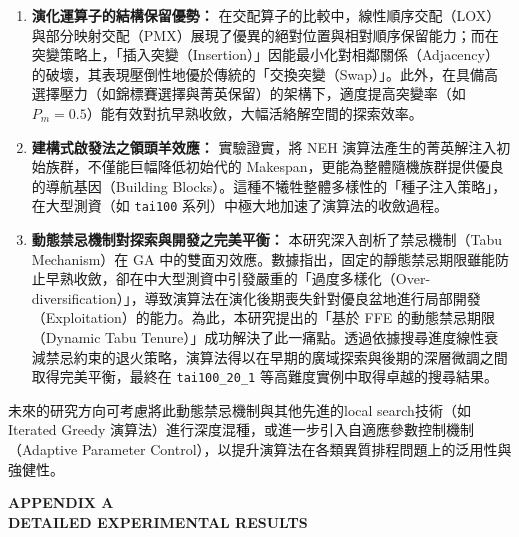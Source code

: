 \documentclass[conference]{IEEEtran}
\begin{document}
\begin{enumerate}
    \item \textbf{演化運算子的結構保留優勢：} 在交配算子的比較中，線性順序交配（LOX）與部分映射交配（PMX）展現了優異的絕對位置與相對順序保留能力；而在突變策略上，「插入突變（Insertion）」因能最小化對相鄰關係（Adjacency）的破壞，其表現壓倒性地優於傳統的「交換突變（Swap）」。此外，在具備高選擇壓力（如錦標賽選擇與菁英保留）的架構下，適度提高突變率（如 $P_m=0.5$）能有效對抗早熟收斂，大幅活絡解空間的探索效率。
    \item \textbf{建構式啟發法之領頭羊效應：} 實驗證實，將 NEH 演算法產生的菁英解注入初始族群，不僅能巨幅降低初始代的 Makespan，更能為整體隨機族群提供優良的導航基因（Building Blocks）。這種不犧牲整體多樣性的「種子注入策略」，在大型測資（如 \texttt{tai100} 系列）中極大地加速了演算法的收斂過程。
    \item \textbf{動態禁忌機制對探索與開發之完美平衡：} 本研究深入剖析了禁忌機制（Tabu Mechanism）在 GA 中的雙面刃效應。數據指出，固定的靜態禁忌期限雖能防止早熟收斂，卻在中大型測資中引發嚴重的「過度多樣化（Over-diversification）」，導致演算法在演化後期喪失針對優良盆地進行局部開發（Exploitation）的能力。為此，本研究提出的「基於 FFE 的動態禁忌期限（Dynamic Tabu Tenure）」成功解決了此一痛點。透過依據搜尋進度線性衰減禁忌約束的退火策略，演算法得以在早期的廣域探索與後期的深層微調之間取得完美平衡，最終在 \texttt{tai100\_20\_1} 等高難度實例中取得卓越的搜尋結果。
\end{enumerate}

未來的研究方向可考慮將此動態禁忌機制與其他先進的local search技術（如 Iterated Greedy 演算法）進行深度混種，或進一步引入自適應參數控制機制（Adaptive Parameter Control），以提升演算法在各類異質排程問題上的泛用性與強健性。


\begin{center}
{\Large\bfseries APPENDIX A}\\[0.5em]
{\large\bfseries DETAILED EXPERIMENTAL RESULTS}
\end{center}
\vspace{0.5em}
\end{document}

